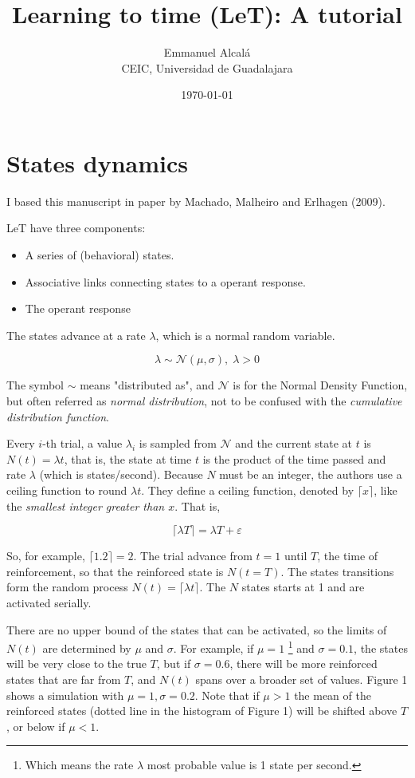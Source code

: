 \documentclass[11pt]{article}
\title{\color{tit} \textsf{\textbf{Learning to time (LeT): A tutorial}}}
\author{\normalsize Emmanuel Alcalá\\
        \normalsize CEIC, Universidad de Guadalajara}
\date{\today}
\begin{document}
    \maketitle

    \section{States dynamics}

I based this manuscript in paper by Machado, Malheiro and Erlhagen (2009).

LeT have three components:

    \begin{itemize}
        \item A series of (behavioral) states.
        \item Associative links connecting states to a operant response.
        \item The operant response
    \end{itemize}

The states advance at a rate $\lambda$, which is a normal random variable.

    \[
        \lambda \sim \mathcal{N} (\mu, \sigma),\; \lambda > 0
    \]

    The symbol $\sim$ means "distributed as", and $\mathcal{N}$ is for the Normal Density Function, but often referred
    as \textit{normal distribution}, not to be confused with the \textit{cumulative distribution function}.

Every $i$-th trial, a value $\lambda_i$ is sampled from $\mathcal{N}$ and the current state at $t$ is $N(t) = \lambda t$, that is,
the state at time $t$ is the product of the time passed and rate $\lambda$ (which is states/second).
Because $N$ must be an integer, the authors use a ceiling function to round $\lambda t$.
They define a ceiling function, denoted by $\lceil x \rceil$, like the \textit{smallest integer greater than $x$}.
That is,

    \[
        \lceil \lambda T \rceil = \lambda T + \varepsilon
    \]

So, for example, $\lceil 1.2 \rceil = 2$. The trial advance from $t = 1$ until $T$, the time of reinforcement, so that the
reinforced state is $N(t = T)$.
    The states transitions form the random process $N(t) = \lceil {\lambda t} \rceil$.
    The $N$ states starts at 1 and are activated serially.

There are no upper bound of the states that can be activated, so the limits of $N(t)$ are determined by $\mu$ and $\sigma$.
For example, if $\mu = 1$ \footnote{Which means the rate $\lambda$ most probable value is 1 state per second.} and $\sigma = 0.1$, the states will be very close to the true $T$, but if $\sigma = 0.6$,
there will be more reinforced states that are far from $T$, and $N(t)$ spans over a broader set of values.
Figure 1 shows a simulation with $\mu=1,\sigma=0.2$.
    Note that if $\mu > 1$ the mean of the reinforced states (dotted line in the histogram of Figure 1) will be shifted above $T$, or below if $\mu < 1$.
\end{document}
